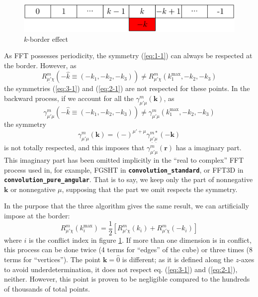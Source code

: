 \begin{figure}[H]
\begin{centering}
\includegraphics{_figure/k-border}
\par\end{centering}
\caption{$k$-border effect\label{fig:k-border-effect}}
\end{figure}

As \acs{FFT} possesses periodicity, the symmetry (\ref{eq:1-1})
can always be respected at the border. However, as
\begin{equation}
R_{\underline{\mu'}\chi}^{m}(-\hat{k}\equiv(-k_{1},-k_{2},-k_{3}))\neq R_{\mu'\chi}^{m}(k_{1}^{\mathrm{max}},-k_{2},-k_{3})
\end{equation}
the symmetries (\ref{eq:3-1}) and (\ref{eq:2-1}) are not respected
for these points. In the backward process, if we account for all the
$\gamma_{\mu'\mu}^{m}(\mathbf{k})$, as
\begin{equation}
\gamma_{\mu'\mu}^{m}(-\hat{k}\equiv(-k_{1},-k_{2},-k_{3}))\neq\gamma_{\mu'\mu}^{m}(k_{1}^{\mathrm{max}},-k_{2},-k_{3})
\end{equation}
the symmetry
\begin{equation}
\gamma_{\mu'\mu}^{m}(\mathbf{k})=(-)^{\mu'+\mu}\gamma_{\underline{\mu'}\underline{\mu}}^{m*}(-\mathbf{k})\label{eq:4-1}
\end{equation}
is not totally respected, and this imposes that $\gamma_{\mu'\mu}^{m}(\mathbf{r})$
has a imaginary part. This imaginary part has been omitted implicitly
in the ``real to complex'' \acs{FFT} process used in, for example,
\acs{FGSHT} in \texttt{\textbf{convolution\_standard}}, or \acs{FFT}3D
in \texttt{\textbf{convolution\_pure\_angular}}. That is to say, we
keep only the part of nonnegative $\mathbf{k}$ or nonnegative $\mu$,
supposing that the part we omit respects the symmetry.

In the purpose that the three algorithm gives the same result, we
can artificially impose at the border:
\begin{equation}
R_{\mu'\chi}^{m}(k_{i}^{\mathrm{max}})=\frac{1}{2}\left[R_{\mu'\chi}^{m}(k_{i})+R_{\mu'\chi}^{m}(-k_{i})\right]
\end{equation}
where $i$ is the conflict index in figure \ref{fig:k-border-effect}.
If more than one dimension is in conflict, this process can be done
twice (4 terms for ``edges'' of the cube) or three times (8 terms
for ``vertices''). The point $\mathbf{k}=\hat{0}$ is different;
as it is defined along the $z$-axes to avoid underdetermination,
it does not respect eq. (\ref{eq:3-1}) and (\ref{eq:2-1}), neither.
However, this point is proven to be negligible compared to the hundreds
of thousands of total points.


